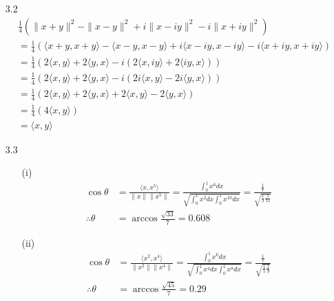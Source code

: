 \documentclass[letterpaper,12pt]{article}
\theoremstyle{definition}
\begin{document}
\begin{enumerate}
    \item[3.2]
    \begin{align*}
      & \frac{1}{4}(\| x+y \|^2 - \|x-y\|^2 + i\| x-iy \|^2 - i\|x+iy\|^2) \\
      &= \frac{1}{4}(\langle x+y,x+y\rangle - \langle x-y,x-y \rangle +i\langle x-iy,x-iy\rangle - i\langle x+iy,x+iy \rangle ) \\
      &= \frac{1}{4}(2\langle x,y \rangle + 2\langle y,x \rangle - i(2\langle x,iy \rangle + 2\langle iy,x \rangle)) \\
      &=  \frac{1}{4}(2\langle x,y \rangle + 2\langle y,x \rangle- i(2i\langle x,y \rangle - 2i\langle y,x \rangle)) \\
      &= \frac{1}{4}(2\langle x,y \rangle + 2\langle y,x \rangle + 2\langle x,y \rangle - 2\langle y,x \rangle) \\
      &= \frac{1}{4}(4\langle x,y \rangle) \\
      &= \langle x,y \rangle
    \end{align*}

    \item[3.3]
      \begin{enumerate}
        \item[(i)]
          \begin{align*}
            \cos \theta &= \frac{\langle x,x^5 \rangle}{\|x\| \|x^5\|} = \frac{\int_0^1 x^6 dx}{\sqrt{\int_0^1 x^2 dx \int_0^1 x^{10} dx}} = \frac{\frac{1}{7}}{\sqrt{\frac{1}{3}\frac{1}{11}}} \\
            \therefore \theta &=\arccos{\frac{\sqrt{33}}{7}} = 0.608
          \end{align*}
        \item[(ii)]
          \begin{align*}
            \cos \theta &= \frac{\langle x^2,x^4 \rangle}{\|x^2\| \|x^4\|} = \frac{\int_0^1 x^6 dx}{\sqrt{\int_0^1 x^4 dx \int_0^1 x^{8} dx}} = \frac{\frac{1}{7}}{\sqrt{\frac{1}{5}\frac{1}{9}}} \\
            \therefore \theta &=\arccos{\frac{\sqrt{45}}{7}} = 0.29
          \end{align*}
      \end{enumerate}


\end{enumerate}
\end{document}
